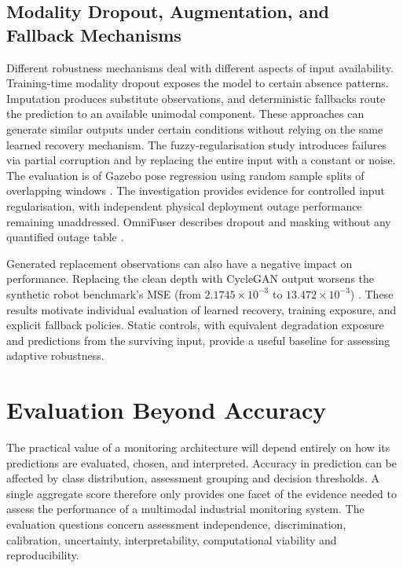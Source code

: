 \subsection{Modality Dropout, Augmentation, and Fallback Mechanisms}

Different robustness mechanisms deal with different aspects of input availability.
Training-time modality dropout exposes the model to certain absence patterns. Imputation produces
substitute observations, and deterministic fallbacks route the prediction to an available unimodal
component.
These approaches can generate similar outputs under certain conditions without relying on the same
learned recovery mechanism.
The fuzzy-regularisation study introduces failures via partial corruption and by replacing the
entire input with a constant or noise. The evaluation is of Gazebo pose regression using random
sample splits of overlapping windows \parencite[Sections~III.A and IV.A--IV.B]{Altinses2023Fuzzy}.
The investigation provides evidence for controlled input regularisation, with independent physical
deployment outage performance remaining unaddressed.
OmniFuser describes dropout and masking without any quantified outage table \parencite[p.~10]{P021}.

Generated replacement observations can also have a negative impact on performance. Replacing the
clean depth with CycleGAN output worsens the synthetic robot benchmark's MSE (from $2.1745 \times
10^{-3}$ to $13.472 \times 10^{-3}$) \parencite[Table~7]{Altinses2025Performance}.
These results motivate individual evaluation of learned recovery, training exposure, and explicit
fallback policies. Static controls, with equivalent degradation exposure and predictions from the
surviving input, provide a useful baseline for assessing adaptive robustness.

\section{Evaluation Beyond Accuracy}

The practical value of a monitoring architecture will depend entirely on how its predictions are
evaluated, chosen, and interpreted.
Accuracy in prediction can be affected by class distribution, assessment grouping and decision
thresholds. A single aggregate score therefore only provides one facet of the evidence needed to
assess the performance of a multimodal industrial monitoring system.
The evaluation questions concern assessment independence, discrimination, calibration, uncertainty, interpretability, computational viability and reproducibility.

